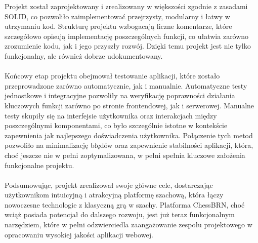 \documentclass[twoside]{projektInzynierskiMS1}
\begin{document}
Projekt został zaprojektowany i zrealizowany w większości zgodnie z zasadami SOLID, co pozwoliło zaimplementować przejrzysty, modularny i łatwy w utrzymaniu kod. Strukturę projektu wzbogacają liczne komentarze, które szczegółowo opisują implementację poszczególnych funkcji, co ułatwia zarówno zrozumienie kodu, jak i jego przyszły rozwój. Dzięki temu projekt jest nie tylko funkcjonalny, ale również dobrze udokumentowany.
\\\\
Końcowy etap projektu obejmował testowanie aplikacji, które zostało przeprowadzone zarówno automatycznie, jak i manualnie. Automatyczne testy jednostkowe i integracyjne pozwoliły na weryfikację poprawności działania kluczowych funkcji zarówno po stronie frontendowej, jak i serwerowej. Manualne testy skupiły się na interfejsie użytkownika oraz interakcjach między poszczególnymi komponentami, co było szczególnie istotne w kontekście zapewnienia jak najlepszego doświadczenia użytkownika. Połączenie tych metod pozwoliło na minimalizację błędów oraz zapewnienie stabilności aplikacji, która, choć jeszcze nie w pełni zoptymalizowana, w pełni spełnia kluczowe założenia funkcjonalne projektu.
\\\\
Podsumowując, projekt zrealizował swoje główne cele, dostarczając użytkownikom intuicyjną i atrakcyjną platformę szachową, która łączy nowoczesne technologie z klasyczną grą w szachy. Platforma ChessBRN, choć wciąż posiada potencjał do dalszego rozwoju, jest już teraz funkcjonalnym narzędziem, które w pełni odzwierciedla zaangażowanie zespołu projektowego w opracowaniu wysokiej jakości aplikacji webowej.
\end{document}
